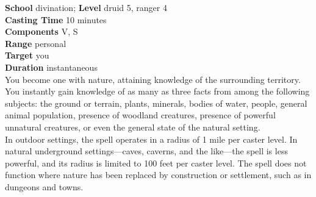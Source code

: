 \textbf{School} divination; \textbf{Level} druid 5, ranger 4\\
\textbf{Casting Time} 10 minutes\\
\textbf{Components} V, S\\
\textbf{Range} personal\\
\textbf{Target} you\\
\textbf{Duration} instantaneous\\
You become one with nature, attaining knowledge of the surrounding territory. You instantly gain knowledge of as many as three facts from among the following subjects: the ground or terrain, plants, minerals, bodies of water, people, general animal population, presence of woodland creatures, presence of powerful unnatural creatures, or even the general state of the natural setting.\\
In outdoor settings, the spell operates in a radius of 1 mile per caster level. In natural underground settings—caves, caverns, and the like—the spell is less powerful, and its radius is limited to 100 feet per caster level. The spell does not function where nature has been replaced by construction or settlement, such as in dungeons and towns.\\
